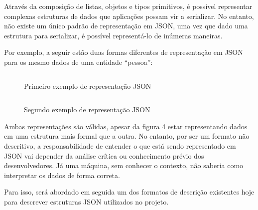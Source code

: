 \begin{table}[H]
  \centering
  \caption{Exemplo de tipos de valores em JSON}
\end{table}

Através da composição de listas, objetos e tipos primitivos, é possível representar complexas estruturas de dados que aplicações possam vir a serializar. No entanto, não existe um único padrão de representação em JSON, uma vez que dado uma estrutura para serializar, é possível representá-lo de inúmeras maneiras. \cite{Droettboom2015}

Por exemplo, a seguir estão duas formas diferentes de representação em JSON para os mesmo dados de uma entidade “pessoa”:

\begin{figure}[H]
  \centering
  \inputminted[frame=single,framesep=10pt]{javascript}{anexos/pessoa.json}
  \caption{Primeiro exemplo de representação JSON}
\end{figure}

\begin{figure}[H]
  \centering
  \inputminted[frame=single,framesep=10pt]{javascript}{anexos/pessoa-2.json}
  \caption{Segundo exemplo de representação JSON}
\end{figure}

Ambas representações são válidas, apesar da figura 4 estar representando dados em uma estrutura mais formal que a outra. No entanto, por ser um formato não descritivo, a responsabilidade de entender o que está sendo representado em JSON vai depender da análise crítica ou conhecimento prévio dos desenvolvedores. Já uma máquina, sem conhecer o contexto, não saberia como interpretar os dados de forma correta. \cite{Droettboom2015}

Para isso, será abordado em seguida um dos formatos de descrição existentes hoje para descrever estruturas JSON utilizados no projeto.


